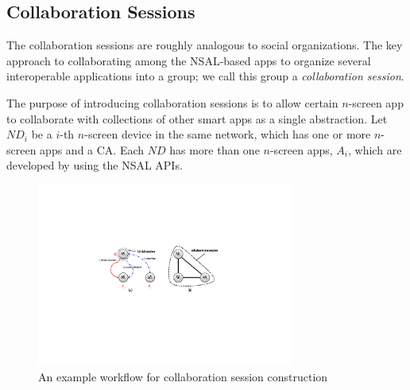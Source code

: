 \documentclass[conference]{IEEEtran}
\begin{document}
\subsection{Collaboration Sessions}
The collaboration sessions are roughly analogous to social organizations.
The key approach to collaborating among the NSAL-based apps to organize several interoperable applications into a group; we call this group a \textit{collaboration session}.

The purpose of introducing collaboration sessions is to allow certain $n$-screen app to collaborate with collections of other smart apps as a single abstraction. Let $ND_i$ be a $i$-th $n$-screen device in the same network,  which has one or more $n$-screen apps and a CA.
Each $ND$ has more than one $n$-screen apps, $A_i$, which are developed by using the NSAL APIs.
    \begin{figure}[htb] %
    \centering
    \includegraphics[width=8.5cm,keepaspectratio]{consession}
    \caption{An example workflow for collaboration session construction}
    \label{fig:constructsession}
    \end{figure}
\end{document}
